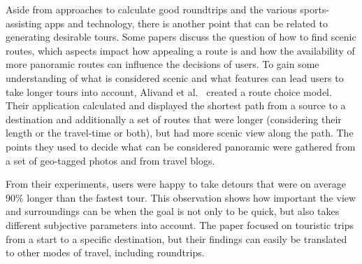 Aside from approaches to calculate good roundtrips and the various sports-assisting apps and technology, there is another point that can be related to generating desirable tours.
Some papers discuss the question of how to find scenic routes, which aspects impact how appealing a route is and how the availability of more panoramic routes can influence the decisions of users.
To gain some understanding of what is considered scenic and what features can lead users to take longer tours into account, Alivand et al.\ \cite{alivand_analyzing_2015} created a route choice model.
Their application calculated and displayed the shortest path from a source to a destination and additionally a set of routes that were longer (considering their length or the travel-time or both), but had more scenic view along the path.
The points they used to decide what can be considered panoramic were gathered from a set of geo-tagged photos and from travel blogs.

From their experiments, users were happy to take detours that were on average 90\% longer than the fastest tour.
This observation shows how important the view and surroundings can be when the goal is not only to be quick, but also takes different subjective parameters into account.
The paper focused on touristic trips from a start to a specific destination, but their findings can easily be translated to other modes of travel, including roundtrips.


